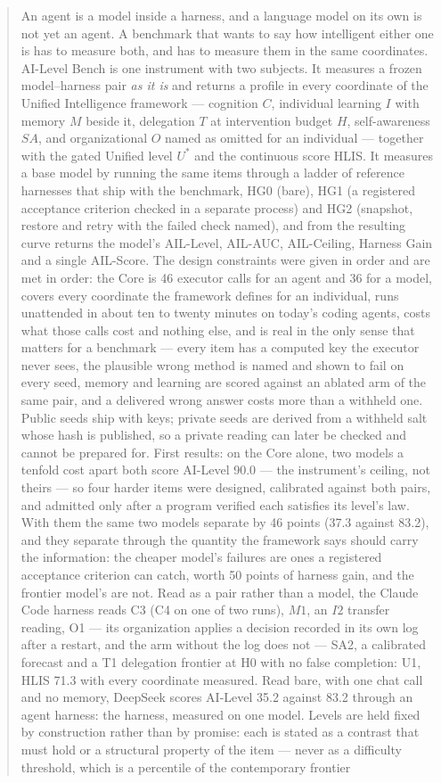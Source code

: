 \documentclass[11pt]{article}
\theoremstyle{definition}
\begin{document}
\begin{abstract}
An agent is a model inside a harness, and a language model on its own is not yet an agent. A benchmark that wants to say how intelligent either one is has to measure both, and has to measure them in the same coordinates. AI-Level Bench is one instrument with two subjects. It measures a frozen model--harness pair \emph{as it is} and returns a profile in every coordinate of the Unified Intelligence framework \citep{yang2026unified} --- cognition $C$, individual learning $I$ with memory $M$ beside it, delegation $T$ at intervention budget $H$, self-awareness $SA$, and organizational $O$ named as omitted for an individual --- together with the gated Unified level $U^{*}$ and the continuous score HLIS. It measures a base model by running the same items through a ladder of reference harnesses that ship with the benchmark, HG0 (bare), HG1 (a registered acceptance criterion checked in a separate process) and HG2 (snapshot, restore and retry with the failed check named), and from the resulting curve returns the model's AIL-Level, AIL-AUC, AIL-Ceiling, Harness Gain and a single AIL-Score. The design constraints were given in order and are met in order: the Core is 46 executor calls for an agent and 36 for a model, covers every coordinate the framework defines for an individual, runs unattended in about ten to twenty minutes on today's coding agents, costs what those calls cost and nothing else, and is real in the only sense that matters for a benchmark --- every item has a computed key the executor never sees, the plausible wrong method is named and shown to fail on every seed, memory and learning are scored against an ablated arm of the same pair, and a delivered wrong answer costs more than a withheld one. Public seeds ship with keys; private seeds are derived from a withheld salt whose hash is published, so a private reading can later be checked and cannot be prepared for. First results: on the Core alone, two models a tenfold cost apart both score AI-Level 90.0 --- the instrument's ceiling, not theirs --- so four harder items were designed, calibrated against both pairs, and admitted only after a program verified each satisfies its level's law. With them the same two models separate by 46 points (37.3 against 83.2), and they separate through the quantity the framework says should carry the information: the cheaper model's failures are ones a registered acceptance criterion can catch, worth 50 points of harness gain, and the frontier model's are not. Read as a pair rather than a model, the Claude Code harness reads C3 (C4 on one of two runs), $M1$, an $I2$ transfer reading, O1 --- its organization applies a decision recorded in its own log after a restart, and the arm without the log does not --- SA2, a calibrated forecast and a T1 delegation frontier at H0 with no false completion: U1, HLIS 71.3 with every coordinate measured. Read bare, with one chat call and no memory, DeepSeek scores AI-Level 35.2 against 83.2 through an agent harness: the harness, measured on one model. Levels are held fixed by construction rather than by promise: each is stated as a contrast that must hold or a structural property of the item --- never as a difficulty threshold, which is a percentile of the contemporary frontier 
\end{abstract}
\end{document}
